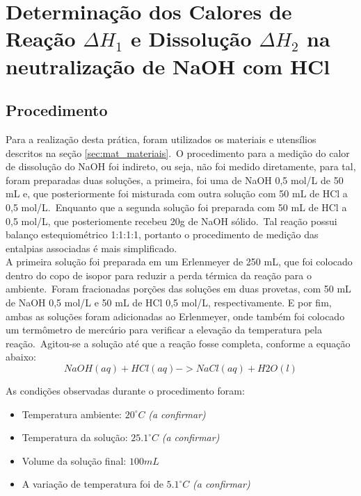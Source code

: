 \section[Parte Experimental]{Determinação dos Calores de Reação  $\Delta{H_{1}}$ e Dissolução $\Delta{H_{2}}$ na neutralização de NaOH com HCl}\label{sec:parte_experimental}
    \subsection{Procedimento}\label{sec:procedimento}

        \indent Para a realização desta prática, foram utilizados os materiais e utensílios descritos na seção \ref{sec:mat_materiais}.\ O procedimento para a medição do calor de dissolução do NaOH foi indireto, ou seja, não foi medido diretamente, para tal, foram preparadas duas soluções, a primeira, foi uma de NaOH 0,5 mol/L de 50 mL e, que posteriormente foi misturada com outra solução com 50 mL de HCl a 0,5 mol/L.\ Enquanto que a segunda solução foi preparada com 50 mL de HCl a 0,5 mol/L, que posteriomente recebeu 20g de NaOH sólido.\ Tal reação possui balanço estequiométrico 1:1:1:1, portanto o procedimento de medição das entalpias associadas é mais simplificado.\\
        
        \indent A primeira solução foi preparada em um Erlenmeyer de 250 mL, que foi colocado dentro do copo de isopor para reduzir a perda térmica da reação para o ambiente.\ Foram fracionadas porções das soluções em duas provetas, com 50 mL de NaOH 0,5 mol/L e 50 mL de HCl 0,5 mol/L, respectivamente. E por fim, ambas as soluções foram adicionadas ao Erlenmeyer, onde também foi colocado um termômetro de mercúrio para verificar a elevação da temperatura pela reação.\ Agitou-se a solução até que a reação fosse completa, conforme a equação abaixo:
        \begin{equation}
            {NaOH(aq) + HCl(aq) -> NaCl(aq) + H2O(l)}
        \end{equation}
    
    	\indent As condições observadas durante o procedimento foram:
    	\begin{itemize}
    		\item Temperatura ambiente: $20^{\circ}C$ \textit{(a confirmar)}
    		\item Temperatura da solução: $25.1^{\circ}C$ \textit{(a confirmar)}
            \item Volume da solução final: $100 mL$
            \item A variação de temperatura foi de ${5.1}^{\circ}C$ \textit{(a confirmar)}
    	\end{itemize}

